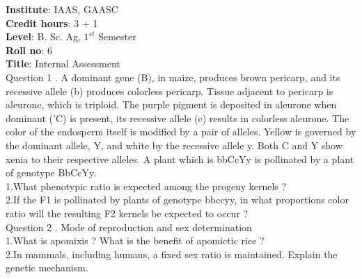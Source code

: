 \documentclass[12pt]{article}\usepackage[]{graphicx}\usepackage[]{color}
\begin{document}
{            \textbf{Institute}: IAAS, GAASC \\}\textbf{Credit hours}: 3 + 1 \\\textbf{Level}: B. Sc. Ag, $1^{st}$ Semester \\\textbf{Roll no}: 6 \\\textbf{Title}: Internal Assessment \\[1cm]Question 1 . A dominant gene (B), in maize, produces brown pericarp, and its recessive allele (b) produces colorless pericarp. Tissue adjacent to pericarp is aleurone, which is triploid. The purple pigment is deposited in aleurone when dominant ('C) is present, its recessive allele (c) results in colorless aleurone. The color of the endosperm itself is modified by a pair of alleles. Yellow is governed by the dominant allele, Y, and white by the recessive allele y. Both C and Y show xenia to their respective alleles. A plant which is bbCcYy is pollinated by a plant of genotype BbCcYy. \\\hspace{0.5cm}1.What phenotypic ratio is expected among the progeny kernels ?\\\hspace{0.5cm}2.If the F1 is pollinated by plants of genotype bbccyy, in what proportions color ratio will the resulting F2 kernels be expected to occur ?\\Question 2 . Mode of reproduction and sex determination \\\hspace{0.5cm}1.What is apomixis ? What is the benefit of apomictic rice ?\\\hspace{0.5cm}2.In mammals, including humans, a fixed sex ratio is maintained. Explain the genetic mechanism.\\
\end{document}
